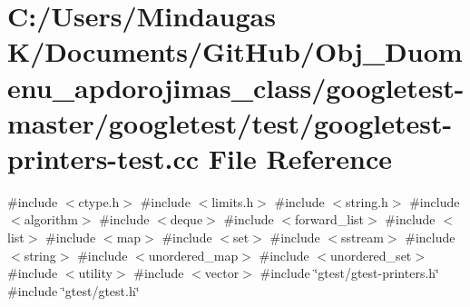 \hypertarget{googletest-master_2googletest_2test_2googletest-printers-test_8cc}{}\section{C\+:/\+Users/\+Mindaugas K/\+Documents/\+Git\+Hub/\+Obj\+\_\+\+Duomenu\+\_\+apdorojimas\+\_\+class/googletest-\/master/googletest/test/googletest-\/printers-\/test.cc File Reference}
\label{googletest-master_2googletest_2test_2googletest-printers-test_8cc}
{\ttfamily \#include $<$ctype.\+h$>$}\newline
{\ttfamily \#include $<$limits.\+h$>$}\newline
{\ttfamily \#include $<$string.\+h$>$}\newline
{\ttfamily \#include $<$algorithm$>$}\newline
{\ttfamily \#include $<$deque$>$}\newline
{\ttfamily \#include $<$forward\+\_\+list$>$}\newline
{\ttfamily \#include $<$list$>$}\newline
{\ttfamily \#include $<$map$>$}\newline
{\ttfamily \#include $<$set$>$}\newline
{\ttfamily \#include $<$sstream$>$}\newline
{\ttfamily \#include $<$string$>$}\newline
{\ttfamily \#include $<$unordered\+\_\+map$>$}\newline
{\ttfamily \#include $<$unordered\+\_\+set$>$}\newline
{\ttfamily \#include $<$utility$>$}\newline
{\ttfamily \#include $<$vector$>$}\newline
{\ttfamily \#include \char`\"{}gtest/gtest-\/printers.\+h\char`\"{}}\newline
{\ttfamily \#include \char`\"{}gtest/gtest.\+h\char`\"{}}\newline
